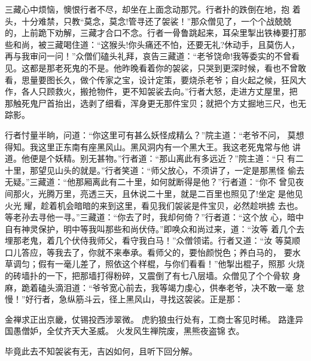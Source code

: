 三藏心中烦恼，懊恨行者不尽，却坐在上面念动那咒。行者扑的跌倒在地，抱
着头，十分难禁，只教“莫念，莫念!管寻还了袈裟！”那众僧见了，一个个战兢兢
的，上前跪下劝解，三藏才合口不念。行者一骨鲁跳起来，耳朵里掣出铁棒要打那
些和尚，被三藏喝住道：“这猴头!你头痛还不怕，还要无礼?休动手，且莫伤人，
再与我审问一问！”众僧们磕头礼拜，哀告三藏道：“老爷饶命!我等委实的不曾看
见。这都是那老死鬼的不是。他昨晚看着你的袈裟，只哭到更深时候，看也不曾敢
看，思量要图长久，做个传家之宝，设计定策，要烧杀老爷；自火起之候，狂风大
作，各人只顾救火，搬抢物件，更不知袈裟去向。”行者大怒，走进方丈屋里，把
那触死鬼尸首抬出，选剥了细看，浑身更无那件宝贝；就把个方丈掘地三尺，也无
踪影。

行者忖量半晌，问道：“你这里可有甚么妖怪成精么？”院主道：“老爷不问，
莫想得知。我这里正东南有座黑风山。黑风洞内有一个黑大王。我这老死鬼常与他
讲道。他便是个妖精。别无甚物。”行者道：“那山离此有多远近？”院主道：“只
有二十里，那望见山头的就是。”行者笑道：“师父放心，不须讲了，一定是那黑怪
偷去无疑。”三藏道：“他那厢离此有二十里，如何就断得是他？”行者道：“你不
曾见夜间那火，光腾万里，亮透三天，且休说二十里，就是二百里也照见了!坐定
是他见火光耀，趁着机会暗暗的来到这里，看见我们袈裟是件宝贝，必然趁哄掳
去也。等老孙去寻他一寻。”三藏道：“你去了时，我却何倚？”行者道：“这个放
心，暗中自有神灵保护，明中等我叫那些和尚伏侍。”即唤众和尚过来，道：“汝等
着几个去埋那老鬼，着几个伏侍我师父，看守我白马！”众僧领诺。行者又道：“汝
等莫顺口儿答应，等我去了，你就不来奉承。看师父的，要怡颜悦色；养白马的，
要水草调匀；假有一毫儿差了，照依这个样棍，与你们看看！”他掣出棍子，照那
火烧的砖墙扑的一下，把那墙打得粉碎，又震倒了有七八层墙。众僧见了个个骨软
身麻，跪着磕头滴泪道：“爷爷宽心前去，我等竭力虔心，供奉老爷，决不敢一毫
怠慢！”好行者，急纵筋斗云，径上黑风山，寻找这袈裟。正是那：

金禅求正出京畿，仗锡投西涉翠微。
虎豹狼虫行处有，工商士客见时稀。
路逢异国愚僧妒，全仗齐天大圣威。
火发风生禅院废，黑熊夜盗锦衣。

毕竟此去不知袈裟有无，吉凶如何，且听下回分解。